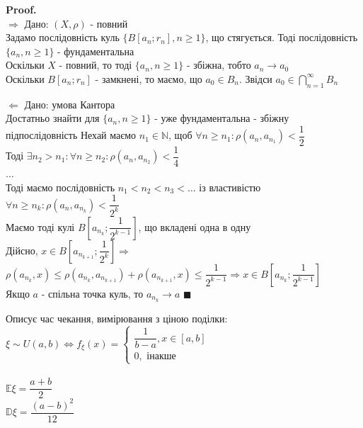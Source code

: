 \documentclass[a4paper, 14pt]{extarticle}
\def\huge{\displaystyle}
\def\rightproof{$\boxed{\Rightarrow}$ }
\def\leftproof{$\boxed{\Leftarrow}$ }
\theoremstyle{theoremdd}
\theoremstyle{theoremdd}
\theoremstyle{theoremdd}
\theoremstyle{theoremdd}
\theoremstyle{theoremdd}
\theoremstyle{theoremdd}
\theoremstyle{theoremdd}
\theoremstyle{theoremdd}
\newenvironment{pfNoTh}{\textbf{Proof. \\}}{$\blacksquare$}
\begin{document}
\begin{pfNoTh}
\rightproof Дано: $(X,\rho)$ - повний\\
Задамо послідовність куль $\{B[a_n;r_n], n \geq 1\}$, що стягується. Тоді послідовність $\{a_n, n \geq 1\}$ - фундаментальна\\
Оскільки $X$ - повний, то тоді $\{a_n, n \geq 1\}$ - збіжна, тобто $a_n \to a_0$\\
Оскільки $B[a_n;r_n]$ - замкнені, то маємо, що $a_0 \in B_n$. Звідси $a_0 \huge \in \bigcap_{n=1}^\infty B_n$
\bigskip

\leftproof Дано: умова Кантора\\
Достатньо знайти для $\{a_n, n \geq 1\}$ - уже фундаментальна - збіжну підпослідовність
Нехай маємо $n_1 \in \mathbb{N}$, щоб $\forall n \geq n_1: \rho(a_n,a_{n_1}) < \dfrac{1}{2}$\\
Тоді $\exists n_2 > n_1: \forall n \geq n_2: \rho(a_n,a_{n_2}) < \dfrac{1}{4}$\\
...\\
Тоді маємо послідовність $n_1 < n_2 < n_3 < \dots$ із властивістю\\
$\forall n \geq n_k: \rho(a_n,a_{n_k}) < \dfrac{1}{2^k}$\\
Маємо тоді кулі $B\left[a_{n_k}; \dfrac{1}{2^{k-1}} \right]$, що вкладені одна в одну\\
Дійсно, $x \in B\left[a_{n_{k+1}}; \dfrac{1}{2^{k}} \right] \Rightarrow$\\
$\rho(a_{n_k}, x) \leq \rho(a_{n_k}, a_{n_{k+1}}) + \rho(a_{n_{k+1}},x) \leq \dfrac{1}{2^{k-1}} \Rightarrow x \in B\left[a_{n_k}; \dfrac{1}{2^{k-1}} \right]$\\
Якщо $a$ - спільна точка куль, то $a_{n_k} \to a$
\end{pfNoTh}


\newpage
Описує час чекання, вимірювання з ціною поділки:
\bigskip \\
$\xi \sim U(a,b) \iff f_{\xi}(x) = \begin{cases} \dfrac{1}{b-a}, x \in [a,b] \\
0, \text{ інакше} \end{cases}$\\
\bigskip \\
$\mathbb{E} \xi = \dfrac{a+b}{2}$\\
$\mathbb{D} \xi = \dfrac{(a-b)^2}{12}$\\

\end{document}
